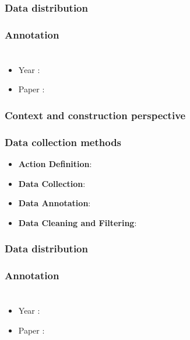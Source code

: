 \documentclass[10pt,onecolumn,letterpaper]{article}
\begin{document}
\subsubsection{Data distribution}
\subsubsection{Annotation}

\section{}

\begin{itemize}
	\item Year : 
	\item Paper : 
\end{itemize}

\subsubsection{Context and construction perspective}
\subsubsection{Data collection methods}
\begin{itemize}
	\item \textbf{Action Definition}:
	\item \textbf{Data Collection}:
	\item \textbf{Data Annotation}:
	\item \textbf{Data Cleaning and Filtering}:
\end{itemize}
\subsubsection{Data distribution}
\subsubsection{Annotation}

\section{}

\begin{itemize}
	\item Year : 
	\item Paper : 
\end{itemize}
\end{document}
